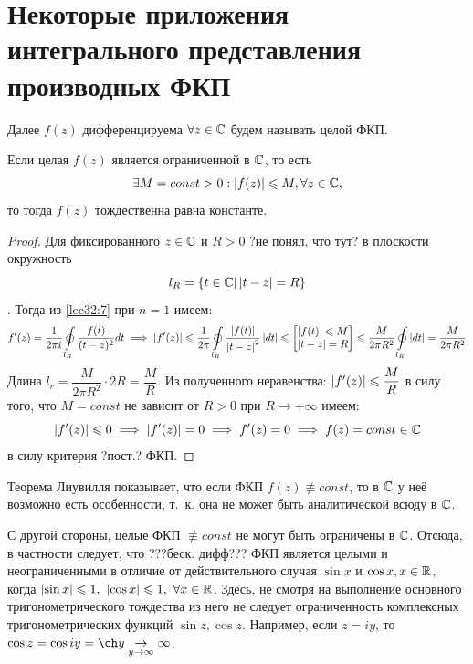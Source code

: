 \documentclass[../../main.tex]{subfiles}
\begin{document}
\section{Некоторые приложения интегрального
	представления производных ФКП}

Далее $f(z)$ дифференцируема $\forall z \in \mathbb{C}$
будем называть целой ФКП.
\begin{thm}[Диувилля]
	Если целая $f(z)$ является ограниченной в $\mathbb{C}$,
	то есть
	\begin{equation}
	\label{lec33:11}
	\exists M = const > 0 : \left|{f(z)}\right|
	\leqslant M, \forall z \in \mathbb{C}, 
	\end{equation}
	то тогда $f(z)$ тождественна равна константе.
	
\end{thm}
	
\begin{proof}
	Для фиксированного $ z \in \mathbb{C} $ и $ R > 0 $ ?не понял, что тут? 
	в плоскости  окружность 
	\[ l_R = \{ t \in \mathbb{C} | \left|{t - z}\right| = R\} \]. 
	Тогда из \eqref{lec32:7} при $ n = 1 $ имеем:
	\[
	f'(z) = \dfrac{1}{2\pi i} \oint\limits_{l_R} 
	\dfrac{f(t)}{(t - z)^2} dt \implies
	\left|{f'(z)}\right| \leqslant \dfrac{1}{2\pi}
	\oint\limits_{l_R} \dfrac{\left|{f(t)}\right|}{\left|{t - z}\right|^2}
	\left|{dt}\right| \leqslant
	\begin{bmatrix}
		\left|{f(t)}\right| \leqslant M \\
		\left|{t - z}\right| = R
	\end{bmatrix} \leqslant \dfrac{M}{2\pi R^2}
	\oint\limits_{l_R} \left|{dt}\right| =
	\dfrac{M}{2\pi R^2}
	\]
	Длина $ l_r = \dfrac{M}{2\pi R^2} \cdot 2R = \dfrac{M}{R} $.
	Из полученного неравенства: $ \left|{f'(z)}\right| \leqslant 
	\dfrac{M}{R} $ в силу того, что $ M = const $ не 
	зависит от $ R > 0 $ при $ R \to +\infty $ имеем:
	\[
	\left|{f'(z)}\right| \leqslant 0 \implies 
	\left|{f'(z)}\right| = 0 \implies 
	f'(z) = 0 \implies 
	f(z) = const \in \mathbb{C}
	\] в силу критерия ?пост.? ФКП.
\end{proof}
\begin{rem}
	Теорема Лиувилля показывает, что если ФКП $ f(z) \not\equiv const $,
	то в $ \mathbb{C} $ у неё возможно есть особенности, т.~к.
	она не может быть аналитической всюду в $ \mathbb{C} $.
\end{rem}
С другой стороны, целые ФКП $ \not\equiv const $ не могут быть ограничены в $ 
\mathbb{C} $.
Отсюда, в частности следует, что ???беск. дифф??? ФКП
является целыми и неограниченными в отличие от действительного 
случая $ \sin x $ и $ \cos x, x \in \mathbb{R} $, когда $ \abs{\sin x} \leq 1,\ 
\abs{\cos x} \leq 1,\ \forall x \in \R $. 
Здесь, не смотря на выполнение основного тригонометрического тождества 
из него не следует ограниченность комплексных тригонометрических функций $ 
\sin z,\cos z $. Например, если $ z = iy $, то
$ \cos z = \cos iy = \ch y
\underset{y \to \infty}{\to} \infty$.
\end{document}
